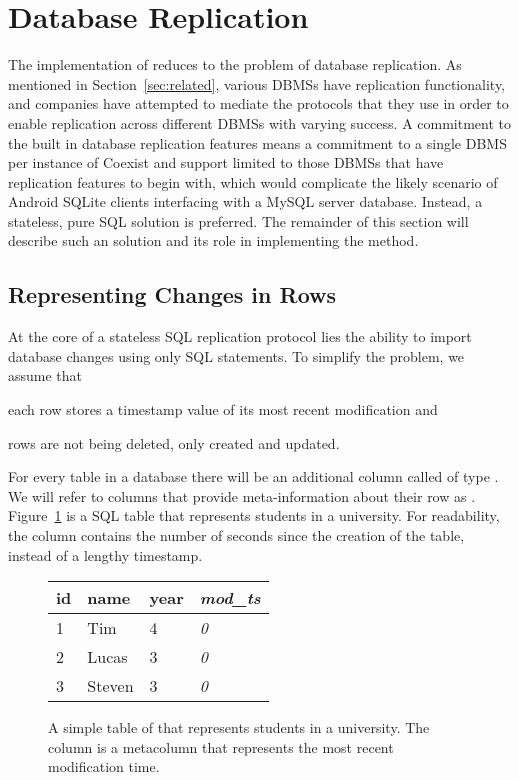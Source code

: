 \section{Database Replication} \label{sec:replication}

The implementation of \sync reduces to the problem of database replication.
As mentioned in Section~\ref{sec:related}, various DBMSs have replication
functionality, and companies have attempted to mediate the protocols that they
use in order to enable replication across different DBMSs with varying success.
A commitment to the built in database replication features means a commitment to
a single DBMS per instance of Coexist and support limited to those DBMSs that
have replication features to begin with, which would complicate the likely
scenario of Android SQLite clients interfacing with a MySQL server database. 
Instead, a stateless, pure SQL solution is preferred. The remainder of
this section will describe such an solution and its role in implementing
the \sync method.


\subsection{Representing Changes in Rows}  \label{sec:changes}

At the core of a stateless SQL replication protocol lies the ability to import
database changes using only SQL statements. To simplify the problem, we assume that
\begin{inparaenum}
\item each row stores a timestamp value of its most recent modification and
\item rows are not being deleted, only created and updated.
\end{inparaenum}
For every table in a database there will be an additional column called
\modts of type . We will refer to columns that provide
meta-information about their row as .
Figure~\ref{fig:student_init} is a SQL table that represents students in a
university. For readability, the \modts column contains the number of seconds
since the creation of the table, instead of a lengthy timestamp.

\begin{figure}[h!]
\center
\begin{tabular}{ l  l  l  l }
id  & name      & year  & \textit{mod\_ts} \\
\hline
1   & Tim   & 4     & \textit{0}        \\
2   & Lucas     & 3     & \textit{0}        \\
3   & Steven    & 3     & \textit{0}        \\
\end{tabular}
\caption{A simple table of that represents students in a university. The \modts
column is a metacolumn that represents the most recent modification time.}
\label{fig:student_init}
\end{figure}


